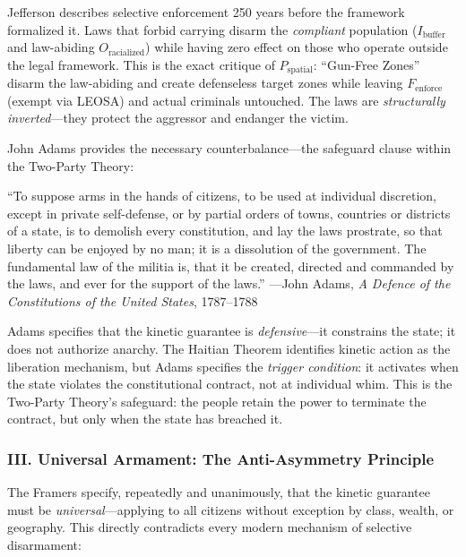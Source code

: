 Jefferson describes selective enforcement 250 years before the framework formalized it. Laws that forbid carrying disarm the \textit{compliant} population ($I_{\text{buffer}}$ and law-abiding $O_{\text{racialized}}$) while having zero effect on those who operate outside the legal framework. This is the exact critique of $P_{\text{spatial}}$: ``Gun-Free Zones'' disarm the law-abiding and create defenseless target zones while leaving $F_{\text{enforce}}$ (exempt via LEOSA) and actual criminals untouched. The laws are \textit{structurally inverted}---they protect the aggressor and endanger the victim.

John Adams provides the necessary counterbalance---the safeguard clause within the Two-Party Theory:

\begin{historicalsource}
``To suppose arms in the hands of citizens, to be used at individual discretion, except in private self-defense, or by partial orders of towns, countries or districts of a state, is to demolish every constitution, and lay the laws prostrate, so that liberty can be enjoyed by no man; it is a dissolution of the government. The fundamental law of the militia is, that it be created, directed and commanded by the laws, and ever for the support of the laws.'' \hfill ---John Adams, \textit{A Defence of the Constitutions of the United States}, 1787--1788
\end{historicalsource}

Adams specifies that the kinetic guarantee is \textit{defensive}---it constrains the state; it does not authorize anarchy. The Haitian Theorem identifies kinetic action as the liberation mechanism, but Adams specifies the \textit{trigger condition}: it activates when the state violates the constitutional contract, not at individual whim. This is the Two-Party Theory's safeguard: the people retain the power to terminate the contract, but only when the state has breached it.

\subsubsection*{III. Universal Armament: The Anti-Asymmetry Principle}

The Framers specify, repeatedly and unanimously, that the kinetic guarantee must be \textit{universal}---applying to all citizens without exception by class, wealth, or geography. This directly contradicts every modern mechanism of selective disarmament:

